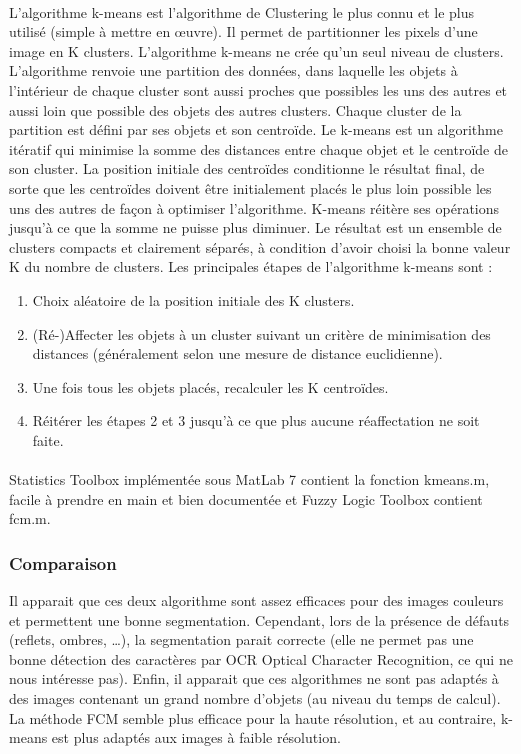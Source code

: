 \paragraph{}
L’algorithme k-means est l’algorithme de Clustering le plus connu et le plus utilisé (simple à mettre en œuvre). Il permet de partitionner les pixels d’une image en K clusters. L’algorithme k-means ne crée qu’un seul niveau de clusters. L’algorithme renvoie une partition des données, dans laquelle les objets à l’intérieur de chaque cluster sont aussi proches que possibles les uns des autres et aussi loin que possible des objets des autres clusters. Chaque cluster de la partition est défini par ses objets et son centroïde. Le k-means est un algorithme itératif qui minimise la somme des distances entre chaque objet et le centroïde de son cluster. La position initiale des centroïdes conditionne le résultat final, de sorte que les centroïdes doivent être initialement placés le plus loin possible les uns des autres de façon à optimiser l’algorithme. K-means réitère ses opérations jusqu’à ce que la somme ne puisse plus diminuer. Le résultat est un ensemble de clusters compacts et clairement séparés, à condition d’avoir choisi la bonne valeur K du nombre de clusters. Les principales étapes de l’algorithme k-means sont :
\begin{enumerate}
\item Choix aléatoire de la position initiale des K clusters.
\item (Ré-)Affecter les objets à un cluster suivant un critère de minimisation des distances (généralement selon une mesure de distance euclidienne).
\item Une fois tous les objets placés, recalculer les K centroïdes.
\item Réitérer les étapes 2 et 3 jusqu’à ce que plus aucune réaffectation ne soit faite.
\end{enumerate}
\paragraph{}
Statistics Toolbox implémentée sous MatLab 7 contient la fonction kmeans.m, facile à prendre en main et bien documentée et Fuzzy Logic Toolbox contient fcm.m.

\subsubsection*{Comparaison}
Il apparait que ces deux algorithme sont assez efficaces pour des images couleurs et permettent une bonne segmentation. Cependant, lors de la présence de défauts (reflets, ombres, …), la segmentation parait correcte (elle ne permet pas une bonne détection des caractères par OCR Optical Character Recognition, ce qui ne nous intéresse pas). Enfin, il apparait que ces algorithmes ne sont pas adaptés à des images contenant un grand nombre d’objets (au niveau du temps de calcul). La méthode FCM semble plus efficace pour la haute résolution, et au contraire, k-means est plus adaptés aux images à faible résolution.

